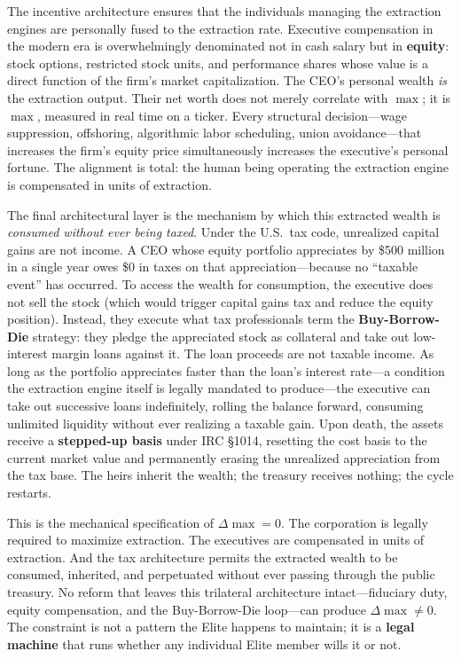\documentclass[12pt,openany]{book}
\begin{document}
The incentive architecture ensures that the individuals managing the extraction engines are personally fused to the extraction rate. Executive compensation in the modern era is overwhelmingly denominated not in cash salary but in \textbf{equity}: stock options, restricted stock units, and performance shares whose value is a direct function of the firm's market capitalization. The CEO's personal wealth \textit{is} the extraction output. Their net worth does not merely correlate with $\max$; it is $\max$, measured in real time on a ticker. Every structural decision---wage suppression, offshoring, algorithmic labor scheduling, union avoidance---that increases the firm's equity price simultaneously increases the executive's personal fortune. The alignment is total: the human being operating the extraction engine is compensated in units of extraction.

The final architectural layer is the mechanism by which this extracted wealth is \textit{consumed without ever being taxed}. Under the U.S.\ tax code, unrealized capital gains are not income. A CEO whose equity portfolio appreciates by \$500 million in a single year owes \$0 in taxes on that appreciation---because no ``taxable event'' has occurred. To access the wealth for consumption, the executive does not sell the stock (which would trigger capital gains tax and reduce the equity position). Instead, they execute what tax professionals term the \textbf{Buy-Borrow-Die} strategy: they pledge the appreciated stock as collateral and take out low-interest margin loans against it. The loan proceeds are not taxable income. As long as the portfolio appreciates faster than the loan's interest rate---a condition the extraction engine itself is legally mandated to produce---the executive can take out successive loans indefinitely, rolling the balance forward, consuming unlimited liquidity without ever realizing a taxable gain. Upon death, the assets receive a \textbf{stepped-up basis} under IRC \S 1014, resetting the cost basis to the current market value and permanently erasing the unrealized appreciation from the tax base. The heirs inherit the wealth; the treasury receives nothing; the cycle restarts.

This is the mechanical specification of $\Delta\max = 0$. The corporation is legally required to maximize extraction. The executives are compensated in units of extraction. And the tax architecture permits the extracted wealth to be consumed, inherited, and perpetuated without ever passing through the public treasury. No reform that leaves this trilateral architecture intact---fiduciary duty, equity compensation, and the Buy-Borrow-Die loop---can produce $\Delta\max \neq 0$. The constraint is not a pattern the Elite happens to maintain; it is a \textbf{legal machine} that runs whether any individual Elite member wills it or not.
\end{document}
